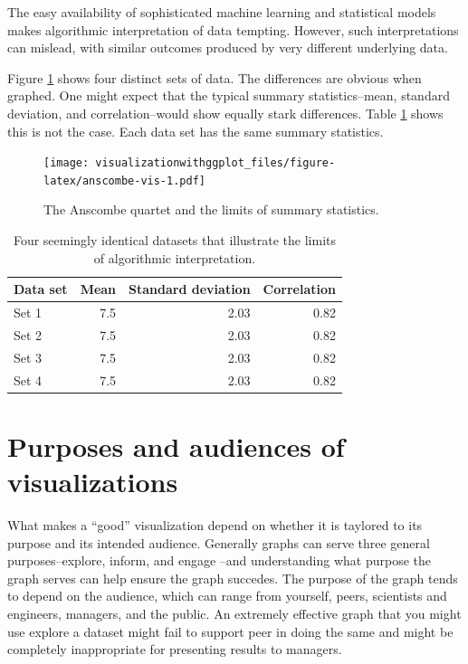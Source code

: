 \documentclass[]{krantz}
\begin{document}
The easy availability of sophisticated machine learning and statistical models makes algorithmic interpretation of data tempting. However, such interpretations can mislead, with similar outcomes produced by very different underlying data.

Figure \ref{fig:anscombe-vis} shows four distinct sets of data. The differences are obvious when graphed. One might expect that the typical summary statistics--mean, standard deviation, and correlation--would show equally stark differences. Table \ref{tab:anscombe-tab} shows this is not the case. Each data set has the same summary statistics.

\begin{figure}
\centering
\texttt{[image: visualizationwithggplot\_files/figure-latex/anscombe-vis-1.pdf]}
\caption{\label{fig:anscombe-vis}The Anscombe quartet and the limits of summary statistics.}
\end{figure}

\begin{table}[t]

\caption{\label{tab:anscombe-tab}Four seemingly identical datasets that illustrate the limits of algorithmic interpretation.}
\centering
\begin{tabular}{lrrr}
\toprule
Data set & Mean & Standard deviation & Correlation\\
\midrule
Set 1 & 7.5 & 2.03 & 0.82\\
Set 2 & 7.5 & 2.03 & 0.82\\
Set 3 & 7.5 & 2.03 & 0.82\\
Set 4 & 7.5 & 2.03 & 0.82\\
\bottomrule
\end{tabular}
\end{table}

\hypertarget{purposes-and-audiences-of-visualizations}{%
\section{Purposes and audiences of visualizations}\label{purposes-and-audiences-of-visualizations}}

What makes a ``good'' visualization depend on whether it is taylored to its purpose and its intended audience. Generally graphs can serve three general purposes--explore, inform, and engage \citep{Gelman2013}--and understanding what purpose the graph serves can help ensure the graph succedes. The purpose of the graph tends to depend on the audience, which can range from yourself, peers, scientists and engineers, managers, and the public. An extremely effective graph that you might use explore a dataset might fail to support peer in doing the same and might be completely inappropriate for presenting results to managers.
\end{document}
